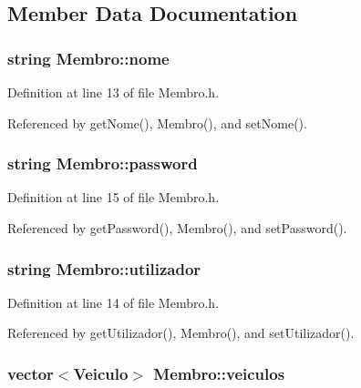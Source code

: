 \subsection{Member Data Documentation}
\hypertarget{class_membro_a2598bbe34ae32a98f41468b2202a9555}{
\subsubsection[{nome}]{\setlength{\rightskip}{0pt plus 5cm}string Membro\+::nome\hspace{0.3cm}{\ttfamily [protected]}}}\label{class_membro_a2598bbe34ae32a98f41468b2202a9555}


Definition at line 13 of file Membro.\+h.



Referenced by get\+Nome(), Membro(), and set\+Nome().

\hypertarget{class_membro_ae2b12fc3e91efc674c07e735edf4ac21}{
\subsubsection[{password}]{\setlength{\rightskip}{0pt plus 5cm}string Membro\+::password\hspace{0.3cm}{\ttfamily [protected]}}}\label{class_membro_ae2b12fc3e91efc674c07e735edf4ac21}


Definition at line 15 of file Membro.\+h.



Referenced by get\+Password(), Membro(), and set\+Password().

\hypertarget{class_membro_a42cc733ff94ec8d1bbfdacc62dfbb0e7}{
\subsubsection[{utilizador}]{\setlength{\rightskip}{0pt plus 5cm}string Membro\+::utilizador\hspace{0.3cm}{\ttfamily [protected]}}}\label{class_membro_a42cc733ff94ec8d1bbfdacc62dfbb0e7}


Definition at line 14 of file Membro.\+h.



Referenced by get\+Utilizador(), Membro(), and set\+Utilizador().

\hypertarget{class_membro_a7485fc8a9f992a05662866f19b22f74a}{
\subsubsection[{veiculos}]{\setlength{\rightskip}{0pt plus 5cm}vector$<${\bf Veiculo}$>$ Membro\+::veiculos\hspace{0.3cm}{\ttfamily [protected]}}}\label{class_membro_a7485fc8a9f992a05662866f19b22f74a}


